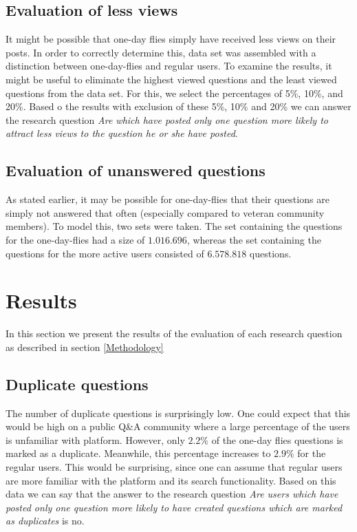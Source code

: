 \documentclass[conference]{IEEEtran}
\begin{document}
\subsection{Evaluation of less views}
It might be possible that one-day flies simply have received less views on their posts.
In order to correctly determine this, data set was assembled with a distinction between one-day-flies and regular users. To examine the results, it might be useful to eliminate the highest viewed questions and the least viewed questions  from the data set. For this, we select the percentages of 5\%, 10\%, and 20\%. Based o the results with exclusion of these 5\%, 10\% and 20\% we can answer the research question \textit{Are which have posted only one question more likely to attract less views to the question he or she have posted}.\\


\subsection{Evaluation of unanswered questions}

As stated earlier, it may be possible for one-day-flies that their questions are simply not answered that often (especially compared to veteran community members). To model this, two sets were taken. The set containing the questions for the one-day-flies had a size of $1.016.696$, whereas the set containing the questions for the more active users consisted of $6.578.818$ questions.

\section{Results}

In this section we present the results of the evaluation of each research question as described in section \ref{Methodology}

\subsection{Duplicate questions}

The number of duplicate questions is surprisingly low. One could expect that this would be high on a public Q\&A community where a large percentage of the users is unfamiliar with platform. However, only $2.2\%$ of the one-day flies questions is marked as a duplicate. Meanwhile, this percentage increases to $2.9\%$ for the regular users. This would be surprising, since one can assume that regular users are more familiar with the platform and its search functionality. Based on this data we can say that the answer to the research question \textit{Are users which have posted only one question more likely to have created questions which are marked as duplicates} is no.
\end{document}
